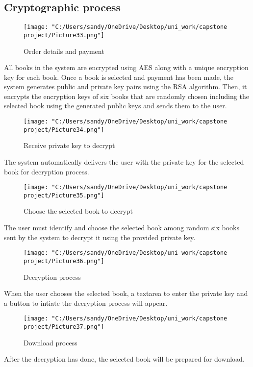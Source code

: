 \documentclass[12pt]{article}
\begin{document}
\subsection{Cryptographic process}
\begin{figure}[H]
	\centering
	\texttt{[image: "C:/Users/sandy/OneDrive/Desktop/uni\_work/capstone project/Picture33.png"]}
	\caption{Order details and payment}
	
\end{figure}
All books in the system are encrypted using AES along with a unique encryption key for each book. Once a book is selected and payment has been made, the system generates public and private key pairs using the RSA algorithm. Then, it encrypts the encryption keys of six books that are randomly chosen including the selected book using the generated public keys and sends them to the user.
\begin{figure}[H]
	\centering
	\texttt{[image: "C:/Users/sandy/OneDrive/Desktop/uni\_work/capstone project/Picture34.png"]}
	\caption{Receive private key to decrypt}
	
\end{figure}
The system automatically delivers the user with the private key for the selected book for decryption process.

\begin{figure}[H]
	\centering
	\texttt{[image: "C:/Users/sandy/OneDrive/Desktop/uni\_work/capstone project/Picture35.png"]}
	\caption{Choose the selected book to decrypt}
	
\end{figure}
The user must identify and choose the selected book among random six books sent by the system to decrypt it using the provided private key.  

\begin{figure}[H]
	\centering
	\texttt{[image: "C:/Users/sandy/OneDrive/Desktop/uni\_work/capstone project/Picture36.png"]}
	\caption{Decryption process}
	
\end{figure}
When the user chooses the selected book, a textarea to enter the private key and a button to intiate the decryption process will appear. 

\begin{figure}[H]
	\centering
	\texttt{[image: "C:/Users/sandy/OneDrive/Desktop/uni\_work/capstone project/Picture37.png"]}
	\caption{Download process}
	
\end{figure}
After the decryption has done, the selected book will be prepared for download.
\end{document}

